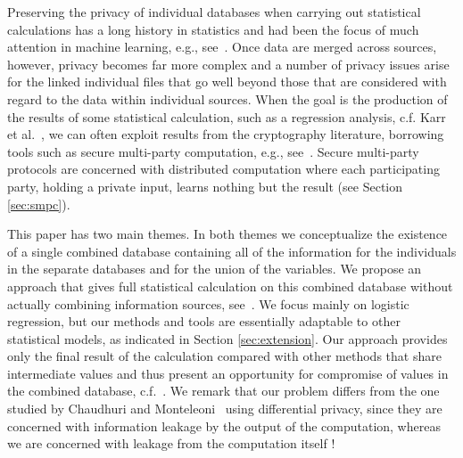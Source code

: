 \documentclass[11pt]{article}
\begin{document}
Preserving the privacy of individual databases when carrying out statistical calculations has a long history in statistics and had been the focus of much attention in machine learning, e.g., see~\cite{aggarwal}. Once data are merged across sources, however, privacy becomes far more complex and a number of privacy issues arise for the linked individual files that go well beyond those that are considered with regard to the data within individual sources. When the goal is the production of the results of some statistical calculation, such as a regression analysis, c.f. Karr et al.~\cite{securereg-jcgs05,securereg-springer06}, we can often exploit results from the cryptography literature, borrowing tools  such as secure multi-party computation, e.g., see~\cite{lindell_pinkas_1,ppdm_book}. Secure multi-party protocols are concerned with distributed computation where each participating party, holding a private input, learns nothing but the result (see Section \ref{sec:smpc}).

This paper has two main themes. In both themes we conceptualize the existence of a single combined database containing all of the information for the individuals in the separate databases and for the union of the variables.    We propose an approach that gives full statistical calculation on this combined database without actually combining information sources, see~\cite{lindell_pinkas_2,lindell_pinkas_1}.  We focus mainly on logistic regression, but our methods and tools are essentially adaptable to other statistical models, as indicated in Section \ref{sec:extension}.  Our approach provides only the final result of the calculation compared with other methods that share intermediate values and thus present an opportunity for compromise of values in the combined database, c.f.~\cite{fien_secure,fien_secure2}. We remark that our problem differs from the one studied by Chaudhuri and Monteleoni~\cite{Chaudhuri} using differential privacy, since they are concerned with information leakage by the output of the computation, whereas we are concerned with leakage from the computation itself !
\end{document}
